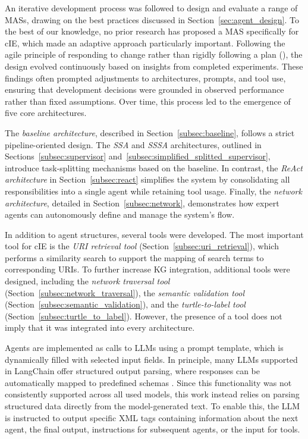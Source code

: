 \documentclass[a4paper,oneside,bibliography=totoc]{scrbook}
\begin{document}
An iterative development process was followed to design and evaluate a range of \acp{MAS}, drawing on the best practices discussed in Section~\ref{sec:agent_design}. To the best of our knowledge, no prior research has proposed a \ac{MAS} specifically for \ac{cIE}, which made an adaptive approach particularly important. Following the agile principle of responding to change rather than rigidly following a plan (\cite{Abrahamsson2017}), the design evolved continuously based on insights from completed experiments. These findings often prompted adjustments to architectures, prompts, and tool use, ensuring that development decisions were grounded in observed performance rather than fixed assumptions. Over time, this process led to the emergence of five core architectures.

The \textit{baseline architecture}, described in Section~\ref{subsec:baseline}, follows a strict pipeline-oriented design. The \textit{\ac{SSA}} and \textit{\ac{SSSA}} architectures, outlined in Sections~\ref{subsec:supervisor} and~\ref{subsec:simplified_splitted_supervisor}, introduce task-splitting mechanisms based on the baseline. In contrast, the \textit{\ac{ReAct} architecture} in Section~\ref{subsec:react} simplifies the system by consolidating all responsibilities into a single agent while retaining tool usage. Finally, the \textit{network architecture}, detailed in Section~\ref{subsec:network}, demonstrates how expert agents can autonomously define and manage the system's flow.

In addition to agent structures, several tools were developed. The most important tool for \ac{cIE} is the \textit{\ac{URI} retrieval tool} (Section~\ref{subsec:uri_retrieval}), which performs a similarity search to support the mapping of search terms to corresponding \acp{URI}. To further increase \ac{KG} integration, additional tools were designed, including the \textit{network traversal tool} (Section~\ref{subsec:network_traversal}), the \textit{semantic validation tool} (Section~\ref{subsec:semantic_validation}), and the \textit{turtle-to-label tool} (Section~\ref{subsec:turtle_to_label}). However, the presence of a tool does not imply that it was integrated into every architecture.

Agents are implemented as calls to \acp{LLM} using a prompt template, which is dynamically filled with selected input fields. In principle, many \acp{LLM} supported in LangChain offer structured output parsing, where responses can be automatically mapped to predefined schemas \cite{LangChain2025e}. Since this functionality was not consistently supported across all used models, this work instead relies on parsing structured data directly from the model-generated text. To enable this, the \ac{LLM} is instructed to output specific \ac{XML} tags containing information about the next agent, the final output, instructions for subsequent agents, or the input for tools.
\end{document}
